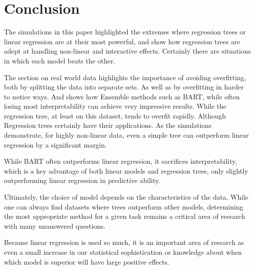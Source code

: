 \documentclass[12pt]{article}
\begin{document}
\section{Conclusion}

The simulations in this paper highlighted the extremes where regression trees or linear regression are at their most powerful, and show how regression trees are adept at handling non-linear and interactive effects. Certainly there are situations in which each model beats the other.

The section on real world data highlights the importance of avoiding overfitting, both by splitting the data into separate sets. As well as by overfitting in harder to notice ways. And shows how Ensemble methods such as BART, while often losing most interpretability can achieve very impressive results. While the regression tree, at least on this dataset, tends to overfit rapidly. Although Regression trees certainly have their applications. As the simulations demonstrate, for highly non-linear data, even a simple tree can outperform linear regression by a significant margin.

While BART often outperforms linear regression, it sacrifices interpretability, which is a key advantage of both linear models and regression trees, only slightly outperforming linear regression in predictive ability.

Ultimately, the choice of model depends on the characteristics of the data. While one can always find datasets where trees outperform other models, determining the most appropriate method for a given task remains a critical area of research with many unanswered questions.

Because linear regression is used so much, it is an important area of research as even a small increase in our statistical sophistication or knowledge about when which model is superior will have large positive effects.



\end{document}
